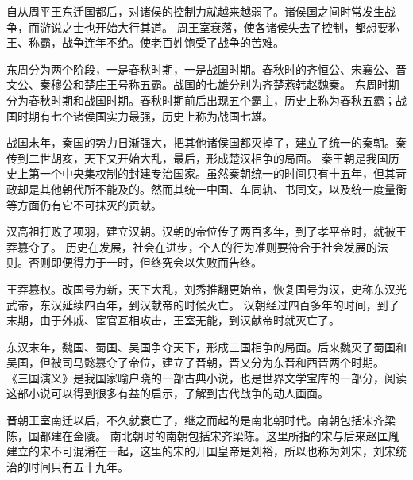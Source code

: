 \documentclass[avery5371,grid]{flashcards}
\begin{document}
{自从周平王东迁国都后，对诸侯的控制力就越来越弱了。诸侯国之间时常发生战争，而游说之士也开始大行其道。} %
{周王室衰落，使各诸侯失去了控制，都想要称王、称霸，战争连年不绝。使老百姓饱受了战争的苦难。} %

{东周分为两个阶段，一是春秋时期，一是战国时期。春秋时的齐恒公、宋襄公、晋文公、秦穆公和楚庄王号称五霸。战国的七雄分别为齐楚燕韩赵魏秦。} %
{东周时期分为春秋时期和战国时期。春秋时期前后出现五个霸主，历史上称为春秋五霸；战国时期有七个诸侯国实力最强，历史上称为战国七雄。} %

{战国末年，秦国的势力日渐强大，把其他诸侯国都灭掉了，建立了统一的秦朝。秦传到二世胡亥，天下又开始大乱，最后，形成楚汉相争的局面。} %
{秦王朝是我国历史上第一个中央集权制的封建专治国家。虽然秦朝统一的时间只有十五年，但其苛政却是其他朝代所不能及的。然而其统一中国、车同轨、书同文，以及统一度量衡等方面仍有它不可抹灭的贡献。} %

{汉高祖打败了项羽，建立汉朝。汉朝的帝位传了两百多年，到了孝平帝时，就被王莽篡夺了。} %
{历史在发展，社会在进步，个人的行为准则要符合于社会发展的法则。否则即便得力于一时，但终究会以失败而告终。} %

{王莽篡权。改国号为新，天下大乱，刘秀推翻更始帝，恢复国号为汉，史称东汉光武帝，东汉延续四百年，到汉献帝的时候灭亡。} %
{汉朝经过四百多年的时间，到了末期，由于外戚、宦官互相攻击，王室无能，到汉献帝时就灭亡了。} %

{东汉末年，魏国、蜀国、吴国争夺天下，形成三国相争的局面。后来魏灭了蜀国和吴国，但被司马懿篡夺了帝位，建立了晋朝，晋又分为东晋和西晋两个时期。} %
{《三国演义》是我国家喻户晓的一部古典小说，也是世界文学宝库的一部分，阅读这部小说可以得到很多有益的启示，了解到古代战争的动人画面。} %

{晋朝王室南迁以后，不久就衰亡了，继之而起的是南北朝时代。南朝包括宋齐梁陈，国都建在金陵。} %
{南北朝时的南朝包括宋齐梁陈。这里所指的宋与后来赵匡胤建立的宋不可混淆在一起，这里的宋的开国皇帝是刘裕，所以也称为刘宋，刘宋统治的时间只有五十九年。} %
\end{document}
